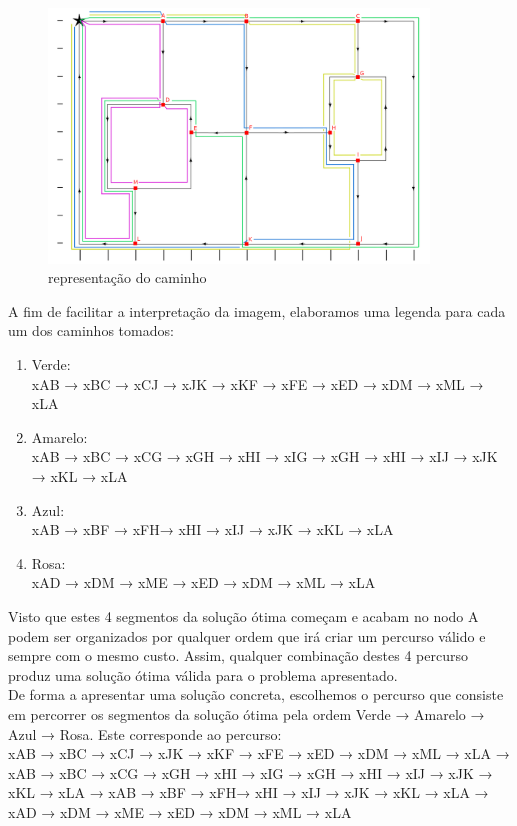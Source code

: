 \documentclass[a4paper]{report}
\begin{document}
\begin{figure}[H]
    \begin{center}
        \includegraphics[width=0.9\textwidth]{images/desafioSolucao.png}\par
        \caption{representação do caminho}
        \label{fig:path}
    \end{center}
\end{figure}
A fim de facilitar a interpretação da imagem, elaboramos uma legenda para cada
um dos caminhos tomados:

\begin{enumerate}
    \item Verde: \\
    xAB → xBC → xCJ → xJK → xKF → xFE → xED → xDM → xML → xLA
    \item Amarelo: \\
    xAB → xBC → xCG → xGH → xHI  → xIG → xGH → xHI → xIJ → xJK  → xKL  → xLA
    \item Azul: \\
    xAB → xBF → xFH→ xHI  → xIJ → xJK  → xKL  → xLA
    \item Rosa: \\
    xAD → xDM → xME → xED  → xDM → xML → xLA
\end{enumerate}
Visto que estes 4 segmentos da solução ótima começam e acabam no nodo A podem
ser organizados por qualquer ordem que irá criar um percurso válido e sempre com
o mesmo custo. Assim, qualquer combinação destes 4 percurso produz uma solução
ótima válida para o problema apresentado.\\
De forma a apresentar uma solução concreta, escolhemos o percurso que consiste em
percorrer os segmentos da solução ótima pela ordem Verde → Amarelo → Azul →
Rosa. Este corresponde ao percurso:\\
xAB → xBC → xCJ → xJK → xKF → xFE → xED → xDM → xML → xLA →
xAB → xBC → xCG → xGH → xHI  → xIG → xGH → xHI → xIJ → xJK  → xKL  → xLA →
xAB → xBF → xFH→ xHI  → xIJ → xJK  → xKL  → xLA →
xAD → xDM → xME → xED  → xDM → xML → xLA
\end{document}

